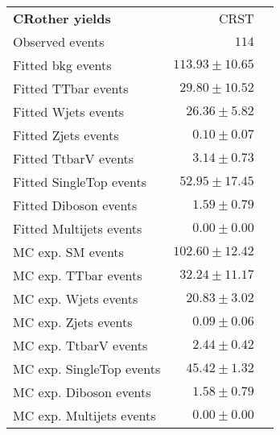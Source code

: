 

\begin{table}[h!]
\begin{center}
\setlength{\tabcolsep}{0.0pc}
{\small
\begin{tabular*}{\textwidth}{@{\extracolsep{\fill}}lrr}
\noalign{\smallskip}\hline\noalign{\smallskip}
{\bf CRother yields}             & CRST              \\[-0.05cm]
\noalign{\smallskip}\hline\noalign{\smallskip}
Observed events                & $114$                    \\
\noalign{\smallskip}\hline\noalign{\smallskip}
Fitted bkg events                & $113.93 \pm 10.65$              \\
\noalign{\smallskip}\hline\noalign{\smallskip}
        Fitted TTbar events              & $29.80 \pm 10.52$              \\
        Fitted Wjets events           & $26.36 \pm 5.82$              \\
        Fitted Zjets events              & $0.10 \pm 0.07$              \\
        Fitted TtbarV events             & $3.14 \pm 0.73$              \\
        Fitted SingleTop events            & $52.95 \pm 17.45$              \\
        Fitted Diboson events                & $1.59 \pm 0.79$              \\
        Fitted Multijets events                & $0.00 \pm 0.00$              \\
 \noalign{\smallskip}\hline\noalign{\smallskip}
MC exp. SM events                    & $102.60 \pm 12.42$              \\
\noalign{\smallskip}\hline\noalign{\smallskip}
        MC exp. TTbar events             & $32.24 \pm 11.17$              \\
        MC exp. Wjets events             & $20.83 \pm 3.02$              \\
        MC exp. Zjets events                & $0.09 \pm 0.06$              \\
        MC exp. TtbarV events              & $2.44 \pm 0.42$              \\
        MC exp. SingleTop events            & $45.42 \pm 1.32$              \\
        MC exp. Diboson events                & $1.58 \pm 0.79$              \\
        MC exp. Multijets events             & $0.00 \pm 0.00$              \\

\end{tabular*}}
\end{center}
\end{table}
